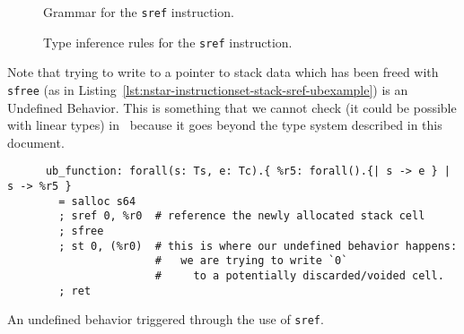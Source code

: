 \begin{figure}[H]
  \centering


  \caption{Grammar for the \texttt{sref} instruction.}
  \label{fig:nstar-instructionset-stack-sref-grammar}
\end{figure}

\begin{figure}[H]
  \centering


  \caption{Type inference rules for the \texttt{sref} instruction.}
  \label{fig:nstar-instructionset-stack-sref-typerules}
\end{figure}

Note that trying to write to a pointer to stack data which has been freed with \texttt{sfree} (as in Listing~\ref{lst:nstar-instructionset-stack-sref-ubexample}) is an Undefined Behavior.
This is something that we cannot check (it could be possible with linear types) in \nstar\ because it goes beyond the type system described in this document.

\begin{listing}[H]
  \centering
  \begin{minipage}{0.90\textwidth}
    \begin{verbatim}
      ub_function: forall(s: Ts, e: Tc).{ %r5: forall().{| s -> e } | s -> %r5 }
        = salloc s64
        ; sref 0, %r0  # reference the newly allocated stack cell
        ; sfree
        ; st 0, (%r0)  # this is where our undefined behavior happens:
                       #   we are trying to write `0`
                       #     to a potentially discarded/voided cell.
        ; ret
    \end{verbatim}
  \end{minipage}
  \caption{An undefined behavior triggered through the use of \texttt{sref}.}
  \label{lst:nstar-instructionset-stack-sref-ubexample}
\end{listing}

